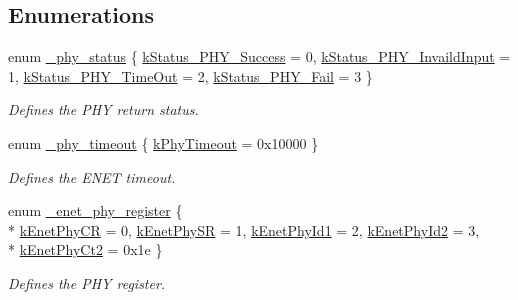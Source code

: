 \subsection*{Enumerations}
\begin{DoxyCompactItemize}
\item 
enum \hyperlink{group__phy__driver_ga28619b08d6526aa3af9ea59c0db08d4b}{\+\_\+phy\+\_\+status} \{ \hyperlink{group__phy__driver_gga28619b08d6526aa3af9ea59c0db08d4bac8639157b9626a9da24a4df380a10609}{k\+Status\+\_\+\+P\+H\+Y\+\_\+\+Success} = 0, 
\hyperlink{group__phy__driver_gga28619b08d6526aa3af9ea59c0db08d4bae0dd54ce4009e13f8af04454bd91183a}{k\+Status\+\_\+\+P\+H\+Y\+\_\+\+Invaild\+Input} = 1, 
\hyperlink{group__phy__driver_gga28619b08d6526aa3af9ea59c0db08d4ba706cfc6c1902d87f0edbbff59ff862c4}{k\+Status\+\_\+\+P\+H\+Y\+\_\+\+Time\+Out} = 2, 
\hyperlink{group__phy__driver_gga28619b08d6526aa3af9ea59c0db08d4badf043d4c63816c6c2e495019fcb618d0}{k\+Status\+\_\+\+P\+H\+Y\+\_\+\+Fail} = 3
 \}\begin{DoxyCompactList}\small\item\em Defines the P\+HY return status. \end{DoxyCompactList}
\item 
enum \hyperlink{group__phy__driver_ga0a607514e221403ba1d43a898e6de111}{\+\_\+phy\+\_\+timeout} \{ \hyperlink{group__phy__driver_gga0a607514e221403ba1d43a898e6de111a6a539892a2a41d48e0877174a63b9864}{k\+Phy\+Timeout} = 0x10000
 \}\begin{DoxyCompactList}\small\item\em Defines the E\+N\+ET timeout. \end{DoxyCompactList}
\item 
enum \hyperlink{group__phy__driver_gab2743b422515f6d141e5386380832475}{\+\_\+enet\+\_\+phy\+\_\+register} \{ \\*
\hyperlink{group__phy__driver_ggab2743b422515f6d141e5386380832475a5342b4c6eadb34dfa8093922766ede92}{k\+Enet\+Phy\+CR} = 0, 
\hyperlink{group__phy__driver_ggab2743b422515f6d141e5386380832475a56b3448a9756a8c8d41fc8b998d060d2}{k\+Enet\+Phy\+SR} = 1, 
\hyperlink{group__phy__driver_ggab2743b422515f6d141e5386380832475aab888a9ba251a4006bc7df865507ed3b}{k\+Enet\+Phy\+Id1} = 2, 
\hyperlink{group__phy__driver_ggab2743b422515f6d141e5386380832475a7e9502c69f543fde3b2f026705b184ac}{k\+Enet\+Phy\+Id2} = 3, 
\\*
\hyperlink{group__phy__driver_ggab2743b422515f6d141e5386380832475ae6836e527f4eafb93e40180f77bde2b8}{k\+Enet\+Phy\+Ct2} = 0x1e
 \}\begin{DoxyCompactList}\small\item\em Defines the P\+HY register. \end{DoxyCompactList}

\end{DoxyCompactItemize}
